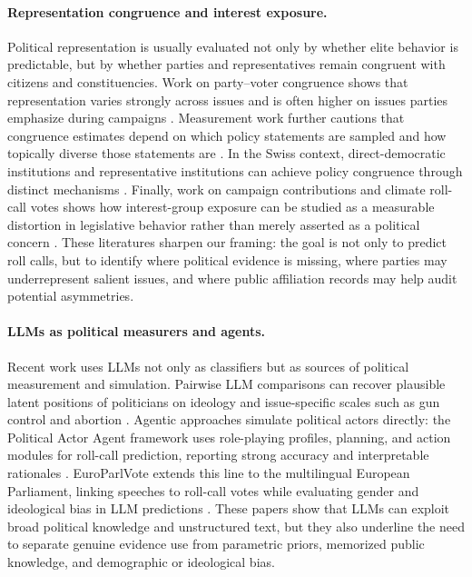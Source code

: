 \documentclass[letterpaper]{article}
\begin{document}
\paragraph{Representation congruence and interest exposure.}
Political representation is usually evaluated not only by whether elite behavior is predictable, but by whether parties and representatives remain congruent with citizens and constituencies. Work on party--voter congruence shows that representation varies strongly across issues and is often higher on issues parties emphasize during campaigns \citep{costello2021congruenceVotersParties}. Measurement work further cautions that congruence estimates depend on which policy statements are sampled and how topically diverse those statements are \citep{lesschaeve2023measuringAgreement}. In the Swiss context, direct-democratic institutions and representative institutions can achieve policy congruence through distinct mechanisms \citep{leemann2013directDemocracyPolicyCongruence}. Finally, work on campaign contributions and climate roll-call votes shows how interest-group exposure can be studied as a measurable distortion in legislative behavior rather than merely asserted as a political concern \citep{gaoHuang2026carbonClimateCongress}. These literatures sharpen our framing: the goal is not only to predict roll calls, but to identify where political evidence is missing, where parties may underrepresent salient issues, and where public affiliation records may help audit potential asymmetries.

\paragraph{LLMs as political measurers and agents.}
Recent work uses LLMs not only as classifiers but as sources of political measurement and simulation. Pairwise LLM comparisons can recover plausible latent positions of politicians on ideology and issue-specific scales such as gun control and abortion \citep{wu2023latentPositionsPoliticians}. Agentic approaches simulate political actors directly: the Political Actor Agent framework uses role-playing profiles, planning, and action modules for roll-call prediction, reporting strong accuracy and interpretable rationales \citep{li2025politicalActorAgent}. EuroParlVote extends this line to the multilingual European Parliament, linking speeches to roll-call votes while evaluating gender and ideological bias in LLM predictions \citep{yang2025demographicsDemocracy}. These papers show that LLMs can exploit broad political knowledge and unstructured text, but they also underline the need to separate genuine evidence use from parametric priors, memorized public knowledge, and demographic or ideological bias.
\end{document}
